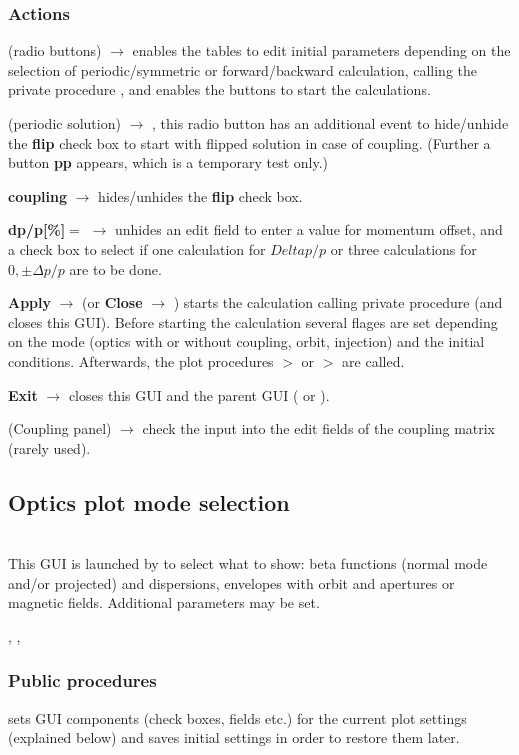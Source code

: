 \documentclass[12pt]{article}
\newcommand\code[1]{{\tt #1}}
\newcommand{\ofld}[1]{\colorbox{black!15}{{\bf #1}}}
\newcommand{\ofldx}[1]{\colorbox{black!15}{(#1)}}
\newcommand\guico[1]{{\color{blue}\code{#1}}}
\newcommand{\unico}[1]{{\color{burntorange}\code{#1}}}
\newcommand{\evcod}[2]{\ofld{#1} $\rightarrow$ \guico{#2}}
\newcommand{\evcodx}[2]{\ofldx{#1} $\rightarrow$ \guico{#2}}
\newcommand{\prcod}[2]{\opauni{#1}$>$\unico{#2}}
\newcommand{\opagui}[1]{\colorbox{blue!20}{{\color{black}\code{#1}}}}
\newcommand{\oguih}[2]{\subsection{\label{#2}#1}{\Huge\opagui{#2}}\\}
\newcommand{\ogui}[1]{\hyperref[#1]{\opagui{#1}}}
\newcommand{\opauni}[1]{\colorbox{orange!30}{{\color{black}\code{#1}}}}
\newcommand{\ouni}[1]{\hyperref[#1]{\opauni{#1}}}
\newcommand{\uses}[1]{\flushleft {\bf Uses:} #1}
\newcommand{\desc}[1]{#1}
\newcommand{\act}[1]{\subsubsection*{Actions} #1}
\newcommand{\ppro}[1]{\subsubsection*{Public procedures} #1}
\begin{document}
\act{
\evcodx{radio buttons}{rbutClick} enables the tables to edit initial parameters depending on the selection of periodic/symmetric or forward/backward calculation, calling the private procedure \guico{set\_pan\_ini}, and enables the buttons to start the calculations.

\evcodx{periodic solution}{rbutperChange}, this radio button has an additional event to hide/unhide the \ofld{flip} check box to start with flipped solution in case of coupling. (Further a button \ofld{pp} appears, which is a temporary test only.)

\evcod{coupling}{chk\_coupChange} hides/unhides the \ofld{flip} check box. 

\evcod{dp/p[\%]$=$}{but\_dppClick} unhides an edit field to enter a value for momentum offset, and a check box to select if one calculation for $Delta p/p$  or three calculations for $0,\pm\Delta p/p$ are to be done.

\evcod{Apply}{butapplyClick} (or \evcod{Close}{butcloClick}) starts the calculation calling private procedure \guico{Go} (and closes this GUI). Before starting the calculation several flages are set depending on the mode (optics with or without coupling, orbit, injection) and the initial conditions. Afterwards, the plot procedures \prcod{linoplib}{OpticCalc} or \prcod{linoplib}{OrbitCalc} are called.

\evcod{Exit}{butexitClick} closes this GUI and the parent GUI (\ogui{opalinop} or \ogui{opaorbit}).

\evcodx{Coupling panel}{ed\_couKeyPress,ed\_couExit} check the input into the edit fields of the coupling matrix (rarely used).
}


\oguih{Optics plot mode selection}{obetenvmag} 

\desc{This GUI is launched by \ogui{opalinop} to select what to show: beta functions (normal mode and/or projected) and dispersions, envelopes with orbit and apertures or magnetic fields. Additional parameters may be set.
}

\uses{\ouni{globlib}, \ouni{mathlib}, \ouni{../com/asaux}} 

\ppro{
\guico{Load} sets GUI components (check boxes, fields etc.) for the current plot settings (explained below) and saves initial settings in order to restore them later.
}
\end{document}
